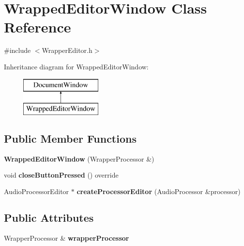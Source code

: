 \hypertarget{class_wrapped_editor_window}{}\section{Wrapped\+Editor\+Window Class Reference}
\label{class_wrapped_editor_window}


{\ttfamily \#include $<$Wrapper\+Editor.\+h$>$}

Inheritance diagram for Wrapped\+Editor\+Window\+:\begin{figure}[H]
\begin{center}
\leavevmode
\includegraphics[height=2.000000cm]{class_wrapped_editor_window}
\end{center}
\end{figure}
\subsection*{Public Member Functions}
\begin{DoxyCompactItemize}
\item 
\mbox{\label{class_wrapped_editor_window_a63a54123d5800ce64ee0f9bf1b66aa7a}} 
{\bfseries Wrapped\+Editor\+Window} (Wrapper\+Processor \&)
\item 
\mbox{\label{class_wrapped_editor_window_abbb46350ce02de85204fa55dfe947e2f}} 
void {\bfseries close\+Button\+Pressed} () override
\item 
\mbox{\label{class_wrapped_editor_window_a2ab6717f6757aff957943601218f35a5}} 
Audio\+Processor\+Editor $\ast$ {\bfseries create\+Processor\+Editor} (Audio\+Processor \&processor)
\end{DoxyCompactItemize}
\subsection*{Public Attributes}
\begin{DoxyCompactItemize}
\item 
\mbox{\label{class_wrapped_editor_window_a42aa09f0dc5d1b78e02ad596a3fded35}} 
Wrapper\+Processor \& {\bfseries wrapper\+Processor}
\end{DoxyCompactItemize}


